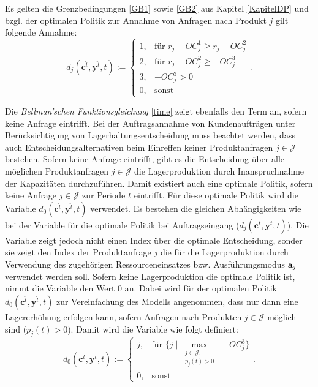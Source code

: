 Es gelten die Grenzbedingungen \eqref{GB1} sowie \eqref{GB2} aus Kapitel \ref{KapitelDP} und bzgl. der optimalen Politik zur Annahme von Anfragen nach Produkt $j$ gilt folgende Annahme:
\begin{equation}\label{GB3}
     d_{j}({\textbf{c}^{\hat t},\textbf{y}^{\hat t}, t}):=\left\{\begin{array}{llll}
     1, & \text{für } r_{j} - OC_{j}^{1} \ge r_{j} - OC_{j}^{2}\\
         2, & \text{für } r_{j} - OC_{j}^{2} \ge -OC_{j}^{3}\\
         3, & -OC_{j}^{3} > 0\\
         0, & \text{sonst}\end{array}\right. .
\end{equation}

Die \textit{Bellman'schen Funktionsgleichung} \eqref{time} zeigt ebenfalls den Term an, sofern keine Anfrage eintrifft. Bei der Auftragsannahme von Kundenaufträgen unter Berücksichtigung von Lagerhaltungsentscheidung muss beachtet werden, dass auch Entscheidungsalternativen beim Einreffen keiner Produktanfragen $j\in\mathcal{J} $ bestehen. Sofern keine Anfrage eintrifft, gibt es die Entscheidung über alle möglichen Produktanfragen $j\in\mathcal{J}$ die Lagerproduktion durch Inanspruchnahme der Kapazitäten durchzuführen. Damit existiert auch eine optimale Politik, sofern keine Anfrage $j\in\mathcal{J}$ zur Periode $t$ eintrifft. Für diese optimale Politik wird die Variable $d_0({\textbf{c}^{\hat t},\textbf{y}^{\hat t},t})$ verwendet. Es bestehen die gleichen Abhängigkeiten wie bei der Variable für die optimale Politik bei Auftragseingang ($d_j({\textbf{c}^{\hat t},\textbf{y}^{\hat t},t})$). Die Variable zeigt jedoch nicht einen Index über die optimale Entscheidung, sonder sie zeigt den Index der Produktanfrage $j$ die für die Lagerproduktion durch Verwendung des zugehörigen Ressourceneinsatzes bzw. Ausführungsmodus $\textbf a_j$ verwendet werden soll. Sofern keine Lagerproduktion die optimale Politik ist, nimmt die Variable den Wert $0$ an. Dabei wird für der optimalen Politik $d_0({\textbf{c}^{\hat t},\textbf{y}^{\hat t},t})$ zur Vereinfachung des Modells angenommen, dass nur dann eine Lagererhöhung erfolgen kann, sofern Anfragen nach Produkten $j\in\mathcal J$ möglich sind ($p_j(t)>0$). Damit wird die Variable wie folgt definiert:
\begin{equation}\label{GB4}
     d_{0}({\textbf{c}^{\hat t},\textbf{y}^{\hat t}, t}):=\left\{\begin{array}{ll}
         j, & \text{für }\{ j\; |\; \max_{\substack{j\in \mathcal{J},\\ p_j(t)>0}} -OC_{j}^{3}\}\\
         0, & \text{sonst}\end{array}\right. .
\end{equation}



